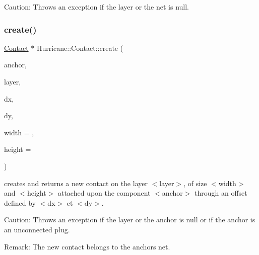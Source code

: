 \begin{DoxyParagraph}{Caution\+:}
Throws an exception if the layer or the net is null. 
\end{DoxyParagraph}
\mbox{\label{classHurricane_1_1Contact_a6645345f819cb4769fac075a0b1ea028}} 
\subsubsection{\texorpdfstring{create()}{create()}\hspace{0.1cm}{\footnotesize\ttfamily [2/2]}}
{\footnotesize\ttfamily \hyperlink{classHurricane_1_1Contact}{Contact} $\ast$ Hurricane\+::\+Contact\+::create (\begin{DoxyParamCaption}\item[{\hyperlink{classHurricane_1_1Component}{Component} $\ast$}]{anchor,  }\item[{const \hyperlink{classHurricane_1_1Layer}{Layer} $\ast$}]{layer,  }\item[{const \hyperlink{group__DbUGroup_ga4fbfa3e8c89347af76c9628ea06c4146}{Db\+U\+::\+Unit} \&}]{dx,  }\item[{const \hyperlink{group__DbUGroup_ga4fbfa3e8c89347af76c9628ea06c4146}{Db\+U\+::\+Unit} \&}]{dy,  }\item[{const \hyperlink{group__DbUGroup_ga4fbfa3e8c89347af76c9628ea06c4146}{Db\+U\+::\+Unit} \&}]{width = {},  }\item[{const \hyperlink{group__DbUGroup_ga4fbfa3e8c89347af76c9628ea06c4146}{Db\+U\+::\+Unit} \&}]{height = {} }\end{DoxyParamCaption})\hspace{0.3cm}{\ttfamily [static]}}

creates and returns a new contact on the layer {\ttfamily $<$layer$>$}, of size {\ttfamily $<$width$>$} and {\ttfamily $<$height$>$} attached upon the component {\ttfamily $<$anchor$>$} through an offset defined by {\ttfamily $<$dx$>$} et {\ttfamily $<$dy$>$}.

\begin{DoxyParagraph}{Caution\+:}
Throws an exception if the layer or the anchor is null or if the anchor is an unconnected plug.
\end{DoxyParagraph}
\begin{DoxyParagraph}{Remark\+:}
The new contact belongs to the anchor\textquotesingle{}s net. 
\end{DoxyParagraph}
\mbox{\label{classHurricane_1_1Contact_a300306b006397377bc9a54ea783c1150}} 
